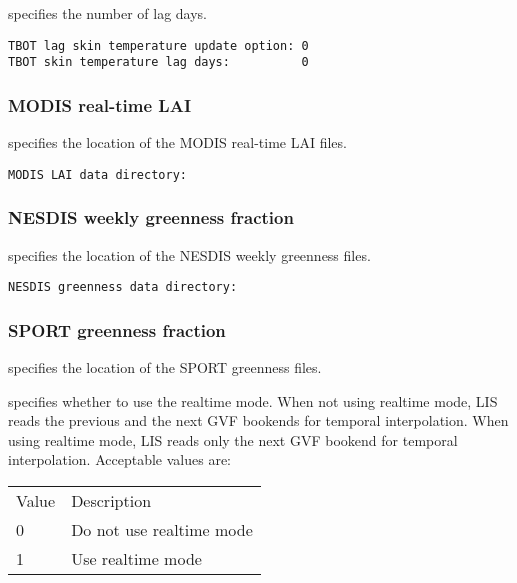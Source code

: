   specifies the number of
 lag days.
 

 \begin{Verbatim}[frame=single]
TBOT lag skin temperature update option: 0
TBOT skin temperature lag days:          0
 \end{Verbatim}

 
 \subsubsection{MODIS real-time LAI}
 \label{sssec:modisrtlai}
 

 
  specifies the location of the
 MODIS real-time LAI files.
 

 \begin{Verbatim}[frame=single]
MODIS LAI data directory:
 \end{Verbatim}

 
 \subsubsection{NESDIS weekly greenness fraction}
 \label{sssec:nesdisgreenness}
 

 
  specifies the location of
 the NESDIS weekly greenness files.
 

 \begin{Verbatim}[frame=single]
NESDIS greenness data directory:
 \end{Verbatim}

 
 \subsubsection{SPORT greenness fraction}
 \label{sssec:sportgreenness}
 

 
  specifies the location of
 the SPORT greenness files.

  specifies whether to use the
 realtime mode.  When not using realtime mode, LIS reads the
 previous and the next GVF bookends for temporal interpolation.
 When using realtime mode, LIS reads only the next GVF bookend
 for temporal interpolation.
 Acceptable values are:

 \begin{tabular}{ll}
 Value & Description              \\
 0     & Do not use realtime mode \\
 1     & Use realtime mode        \\
 \end{tabular}

